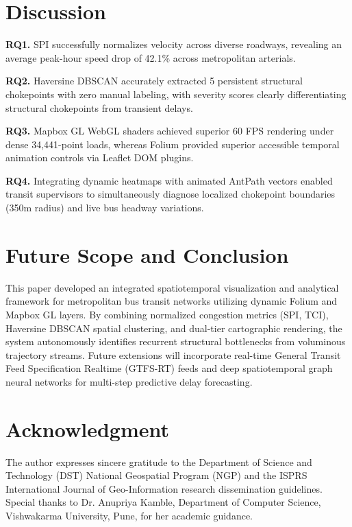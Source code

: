 \documentclass[conference]{IEEEtran}
\begin{document}
\section{Discussion}
\textbf{RQ1.} SPI successfully normalizes velocity across diverse roadways, revealing an average peak-hour speed drop of 42.1\% across metropolitan arterials.

\textbf{RQ2.} Haversine DBSCAN accurately extracted 5 persistent structural chokepoints with zero manual labeling, with severity scores clearly differentiating structural chokepoints from transient delays.

\textbf{RQ3.} Mapbox GL WebGL shaders achieved superior 60 FPS rendering under dense 34,441-point loads, whereas Folium provided superior accessible temporal animation controls via Leaflet DOM plugins.

\textbf{RQ4.} Integrating dynamic heatmaps with animated AntPath vectors enabled transit supervisors to simultaneously diagnose localized chokepoint boundaries (350m radius) and live bus headway variations.

\section{Future Scope and Conclusion}
This paper developed an integrated spatiotemporal visualization and analytical framework for metropolitan bus transit networks utilizing dynamic Folium and Mapbox GL layers. By combining normalized congestion metrics (SPI, TCI), Haversine DBSCAN spatial clustering, and dual-tier cartographic rendering, the system autonomously identifies recurrent structural bottlenecks from voluminous trajectory streams. Future extensions will incorporate real-time General Transit Feed Specification Realtime (GTFS-RT) feeds and deep spatiotemporal graph neural networks for multi-step predictive delay forecasting.

\section*{Acknowledgment}
The author expresses sincere gratitude to the Department of Science and Technology (DST) National Geospatial Program (NGP) and the ISPRS International Journal of Geo-Information research dissemination guidelines. Special thanks to Dr. Anupriya Kamble, Department of Computer Science, Vishwakarma University, Pune, for her academic guidance.
\end{document}
